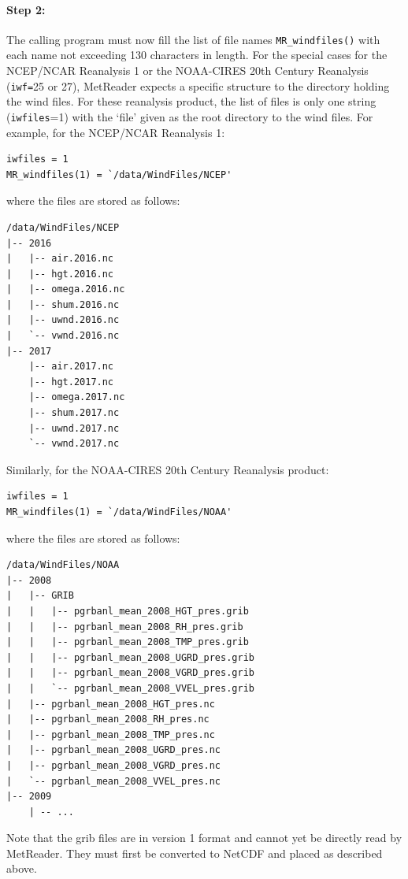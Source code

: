 \documentclass[11pt]{article}   %
\begin{document}
\paragraph{Step 2:} The calling program must now fill the list of file names \texttt{MR\_windfiles()}
with each name not exceeding 130 characters in length.  For the special cases for the NCEP/NCAR
Reanalysis 1 or the NOAA-CIRES 20th Century Reanalysis (\texttt{iwf=}25 or 27), MetReader expects
a specific structure to the directory holding the wind files.  For these reanalysis product,
the list of files is only one string (\texttt{iwfiles}=1)
with the `file' given as the root directory to the wind files.  For example, for the
NCEP/NCAR Reanalysis 1:
\begin{verbatim}
iwfiles = 1
MR_windfiles(1) = `/data/WindFiles/NCEP'
\end{verbatim}
where the files are stored as follows:
\begin{verbatim}
/data/WindFiles/NCEP
|-- 2016
|   |-- air.2016.nc
|   |-- hgt.2016.nc
|   |-- omega.2016.nc
|   |-- shum.2016.nc
|   |-- uwnd.2016.nc
|   `-- vwnd.2016.nc
|-- 2017
    |-- air.2017.nc
    |-- hgt.2017.nc
    |-- omega.2017.nc
    |-- shum.2017.nc
    |-- uwnd.2017.nc
    `-- vwnd.2017.nc
\end{verbatim}
Similarly, for the NOAA-CIRES 20th Century Reanalysis product:
\begin{verbatim}
iwfiles = 1
MR_windfiles(1) = `/data/WindFiles/NOAA'
\end{verbatim}
where the files are stored as follows:
\begin{verbatim}
/data/WindFiles/NOAA
|-- 2008
|   |-- GRIB
|   |   |-- pgrbanl_mean_2008_HGT_pres.grib
|   |   |-- pgrbanl_mean_2008_RH_pres.grib
|   |   |-- pgrbanl_mean_2008_TMP_pres.grib
|   |   |-- pgrbanl_mean_2008_UGRD_pres.grib
|   |   |-- pgrbanl_mean_2008_VGRD_pres.grib
|   |   `-- pgrbanl_mean_2008_VVEL_pres.grib
|   |-- pgrbanl_mean_2008_HGT_pres.nc
|   |-- pgrbanl_mean_2008_RH_pres.nc
|   |-- pgrbanl_mean_2008_TMP_pres.nc
|   |-- pgrbanl_mean_2008_UGRD_pres.nc
|   |-- pgrbanl_mean_2008_VGRD_pres.nc
|   `-- pgrbanl_mean_2008_VVEL_pres.nc
|-- 2009
    | -- ...
\end{verbatim}
Note that the grib files are in version 1 format and cannot yet be directly read by
MetReader.  They must first be converted to NetCDF and placed as described above.
\end{document}

